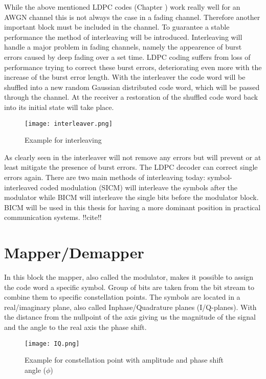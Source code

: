 While the above mentioned \gls{LDPC} codes (Chapter ) work really well for an AWGN channel this is not always the case in a fading channel. Therefore another important block must be included in the channel. To guarantee a stable performance the method of interleaving will be introduced. Interleaving will handle a major problem in fading channels, namely the appearence of burst errors caused by deep fading over a set time. \gls{LDPC} coding suffers from loss of performance trying to correct these burst errors, deteriorating even more with the increase of the burst error length. With the interleaver the code word will be shuffled into a new random Gaussian distributed code word, which will be passed through the channel. At the receiver a restoration of the shuffled code word back into its initial state will take place.
\begin{figure}[!htb]
	\centering
	\texttt{[image: interleaver.png]}
	\caption{Example for interleaving}
	\label{fig:interleaver}
\end{figure}

As clearly seen in  the interleaver will not remove any errors but will prevent or at least mitigate the presence of burst errors. The \gls{LDPC} decoder can correct single errors again. There are two main methods of interleaving today: symbol-interleaved coded modulation (SICM) will interleave the symbols after the modulator while \gls{BICM} will interleave the single bits before the modulator block. \gls{BICM} will be used in this thesis for having a more dominant position in practical communication systems. !!cite!!

\clearpage

\section{Mapper/Demapper}
\label{sec:mapper}

In this block the mapper, also called the modulator, makes it possible to assign the code word a specific symbol. Group of bits are taken from the bit stream to combine them to specific constellation points. The symbols are located in a real/imaginary plane, also called Inphase/Quadrature planes (I/Q-planes). With the distance from the nullpoint of the axis giving us the magnitude of the signal and the angle to the real axis the phase shift. 
\begin{figure}[!htb]
	\centering
	\texttt{[image: IQ.png]}
	\caption{Example for constellation point with amplitude and phase shift angle ($\phi$)}
	\label{fig:IQ}
\end{figure}

